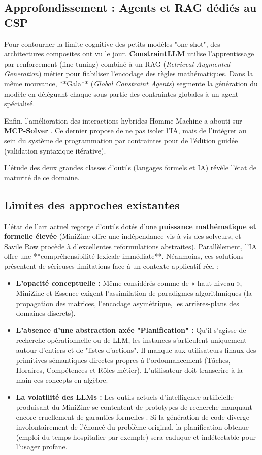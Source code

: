 \subsection{Approfondissement : Agents et RAG dédiés au CSP}
Pour contourner la limite cognitive des petits modèles "one-shot", des architectures composites ont vu le jour. \textbf{ConstraintLLM} \cite{constraintllmemnlp2025} utilise l'apprentissage par renforcement (fine-tuning) combiné à un RAG (\textit{Retrieval-Augmented Generation}) métier pour fiabiliser l'encodage des règles mathématiques. Dans la même mouvance, **Gala** (\textit{Global Constraint Agents}) \cite{gala2025} segmente la génération du modèle en déléguant chaque sous-partie des contraintes globales à un agent spécialisé.

Enfin, l'amélioration des interactions hybrides Homme-Machine a abouti sur \textbf{MCP-Solver} \cite{mcpsolver2024}. Ce dernier propose de ne pas isoler l'IA, mais de l'intégrer au sein du système de programmation par contraintes pour de l'édition guidée (validation syntaxique itérative).


L'étude des deux grandes classes d'outils (langages formels et IA) révèle l'état de maturité de ce domaine.

\subsection{Limites des approches existantes}
L'état de l'art actuel regorge d'outils dotés d'une \textbf{puissance mathématique et formelle élevée} (MiniZinc offre une indépendance vis-à-vis des solveurs, et Savile Row procède à d'excellentes reformulations abstraites). Parallèlement, l'IA offre une **compréhensibilité lexicale immédiate**. Néanmoins, ces solutions présentent de sérieuses limitations face à un contexte applicatif réel :
\begin{itemize}
    \item \textbf{L'opacité conceptuelle : } Même considérés comme de « haut niveau », MiniZinc et Essence exigent l'assimilation de paradigmes algorithmiques (la propagation des matrices, l'encodage asymétrique, les arrières-plans des domaines discrets).
    \item \textbf{L'absence d'une abstraction axée "Planification" :} Qu'il s'agisse de recherche opérationnelle ou de LLM, les instances s'articulent uniquement autour d'entiers et de "listes d'actions". Il manque aux utilisateurs finaux des primitives sémantiques directes propres à l'ordonnancement (Tâches, Horaires, Compétences et Rôles métier). L'utilisateur doit transcrire à la main ces concepts en algèbre.
    \item \textbf{La volatilité des LLMs :} Les outils actuels d'intelligence artificielle produisant du MiniZinc se contentent de prototypes de recherche manquant encore cruellement de garanties formelles \cite{text2zinc2025}. Si la génération de code diverge involontairement de l'énoncé du problème original, la planification obtenue (emploi du temps hospitalier par exemple) sera caduque et indétectable pour l'usager profane.
\end{itemize}

